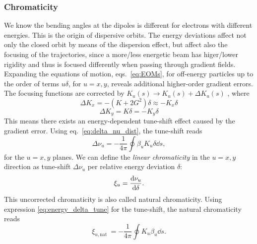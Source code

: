 \subsubsection{Chromaticity}
We know the bending angles at the dipoles is different for electrons with different energies. This is the origin of dispersive orbits. The energy deviations affect not only the closed orbit by means of the dispersion effect, but affect also the focusing of the trajectories, since a more/less energetic beam has higer/lower rigidity and thus is focused differently when passing through gradient fields.
%
Expanding the equations of motion, eqs.~\eqref{eq:EOMs}, for off-energy particles up to the order of terms $u\delta$, for $u=x,y$, reveals additional higher-order gradient errors. The focusing functions are corrected by $K_u(s)\to K_u(s) + \Delta K_u(s)$ \cite{lee_accelerator_2004,huang_beam-based_2019}, where
\begin{equation}
    \Delta K_x = -(K+2G^2)\delta \approx - K_x\delta
\end{equation}
\begin{equation}
    \Delta K_y = K\delta = - K_y\delta
\end{equation}
This means there exists an energy-dependent tune-shift effect caused by the gradient error. Using eq.~\eqref{eq:delta_nu_dist}, the tune-shift reads
\begin{equation}
    \Delta \nu_u = - \frac{1}{4\pi}\oint\beta_u K_u \delta \dd{s},
    \label{eq:energy_delta_tune}
\end{equation}
for the $u=x,y$ planes. We can define the \textit{linear chromaticity} in the $u=x,y$ direction as tune-shift $\Delta \nu_u$ per relative energy deviation $\delta$:
\begin{equation}
    \xi_u=\dv{\nu_u}{\delta}.
\end{equation}
This uncorrected chromaticity is also called natural chromaticity. Using expression \eqref{eq:energy_delta_tune} for the tune-shift, the natural chromaticity reads
\begin{equation}
\xi_{u, \text {nat }} =-\frac{1}{4 \pi} \oint K_u \beta_u \dd{s}.
\end{equation}

